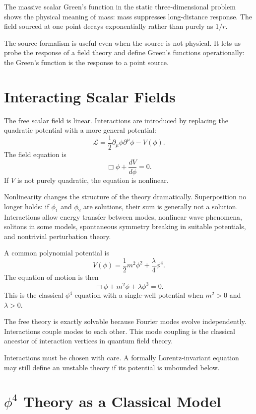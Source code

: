 \begin{examplebox}
The massive scalar Green's function in the static three-dimensional problem
shows the physical meaning of mass: mass suppresses long-distance response.
The field sourced at one point decays exponentially rather than purely as
\(1/r\).
\end{examplebox}

The source formalism is useful even when the source is not physical. It lets us
probe the response of a field theory and define Green's functions operationally:
the Green's function is the response to a point source.

\section{Interacting Scalar Fields}

The free scalar field is linear. Interactions are introduced by replacing the
quadratic potential with a more general potential:
\[
    \mathcal{L}=\frac{1}{2}\partial_\mu\phi\partial^\mu\phi - V(\phi).
\]
The field equation is
\[
    \Box\phi+\frac{dV}{d\phi}=0.
\]
If \(V\) is not purely quadratic, the equation is nonlinear.

Nonlinearity changes the structure of the theory dramatically. Superposition no
longer holds: if \(\phi_1\) and \(\phi_2\) are solutions, their sum is generally
not a solution. Interactions allow energy transfer between modes, nonlinear wave
phenomena, solitons in some models, spontaneous symmetry breaking in suitable
potentials, and nontrivial perturbation theory.

A common polynomial potential is
\[
    V(\phi)=\frac{1}{2}m^2\phi^2+\frac{\lambda}{4}\phi^4.
\]
The equation of motion is then
\[
    \Box\phi+m^2\phi+\lambda\phi^3=0.
\]
This is the classical \(\phi^4\) equation with a single-well potential when
\(m^2>0\) and \(\lambda>0\).

\begin{remarkbox}
The free theory is exactly solvable because Fourier modes evolve independently.
Interactions couple modes to each other. This mode coupling is the classical
ancestor of interaction vertices in quantum field theory.
\end{remarkbox}

Interactions must be chosen with care. A formally Lorentz-invariant equation may
still define an unstable theory if its potential is unbounded below.

\section{\texorpdfstring{\(\phi^4\)}{phi4} Theory as a Classical Model}

